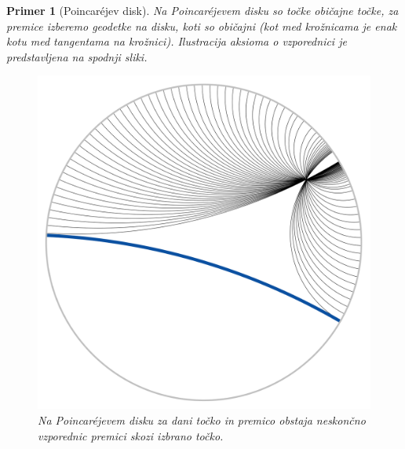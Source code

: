 \documentclass[a4paper]{article}
\newtheorem{primer}{Primer}
\begin{document}
\begin{primer}[Poincar\'ejev disk]
Na Poincar\'ejevem disku so točke običajne točke, za premice izberemo geodetke na disku, koti so običajni (kot med krožnicama je enak kotu med tangentama na krožnici). Ilustracija aksioma o vzporednici je predstavljena na spodnji sliki.
%
\begin{figure}[h!]
\begin{center}
\includegraphics[scale=0.15]{poincare-disk-5aksiom.png}
\caption{Na Poincar\'ejevem disku za dani točko in premico obstaja neskončno vzporednic premici skozi izbrano točko.}
\end{center}
\end{figure}
%
\end{primer}


\begin{thebibliography}{99}

\end{thebibliography}
\end{document}
